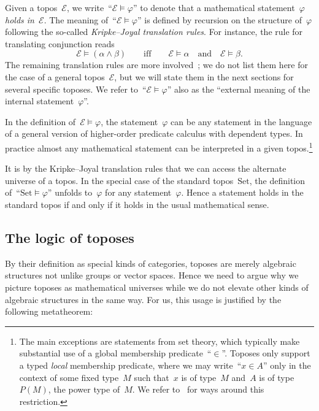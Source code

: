 \documentclass[oneside,reqno]{amsart}
\theoremstyle{definition}
\theoremstyle{plain}
\theoremstyle{remark}
\newcommand{\E}{\mathcal{E}}
\newcommand{\Set}{\mathrm{Set}}
\renewcommand{\_}{\mathpunct{.}\,}
\newcommand{\?}{\,{:}\,}
\begin{document}
Given a topos~$\E$, we write~``$\E \models \varphi$'' to denote that a
mathematical statement~$\varphi$ \emph{holds in~$\E$}. The meaning of~``$\E \models
\varphi$'' is defined by recursion on the structure of~$\varphi$ following the
so-called \emph{Kripke--Joyal translation rules}. For instance, the rule for
translating conjunction reads
\[ \E \models (\alpha \wedge \beta) \qquad\text{iff}\qquad
  \E \models \alpha \quad\text{and}\quad \E \models \beta. \]
The remaining translation rules are more
involved~\cite[Section~VI.7]{moerdijk-maclane:sheaves-logic}; we do not list them here for
the case of a general topos~$\E$, but we will state them in the next sections
for several specific toposes. We refer to~``$\E \models \varphi$'' also as the
``external meaning of the internal statement~$\varphi$''.

In the definition of~$\E \models \varphi$, the statement~$\varphi$ can be any
statement in the language of a general version of higher-order predicate
calculus with dependent types. In practice almost any mathematical statement
can be interpreted in a given topos.\footnote{The main exceptions are
statements from set theory, which typically make substantial use of a global
membership predicate~``$\in$''. Toposes only support a typed \emph{local}
membership predicate, where we may write~``$x \in A$'' only in the context of
some fixed type~$M$ such that~$x$ is of type~$M$ and~$A$ is of
type~$P(M)$, the power type of~$M$. We refer
to~\cite{fourman:sheaf-models,streicher:forcizf,awodey-butz-simpson-streicher:bist}
for ways around this restriction.}

It is by the Kripke--Joyal translation rules that we can access the alternate
universe of a topos. In the special case of the standard topos~$\Set$, the
definition of~``$\Set \models \varphi$'' unfolds to~$\varphi$ for any
statement~$\varphi$. Hence a statement holds in the standard topos if and only
if it holds in the usual mathematical sense.


\subsection{The logic of toposes}\label{sect:logic-of-toposes}
By their definition as special kinds of
categories, toposes are merely algebraic structures not unlike groups or vector
spaces. Hence we need to argue why we picture toposes as mathematical universes
while we do not elevate other kinds of algebraic structures in the same way.
For us, this usage is justified by the following metatheorem:
\end{document}
